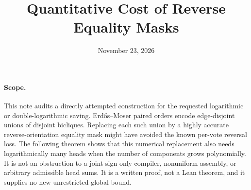 \documentclass[11pt]{article}
\title{Quantitative Cost of Reverse Equality Masks}
\author{}
\date{November 23, 2026}
\begin{document}
\maketitle

\paragraph{Scope.}
This note audits a directly attempted construction for the requested
logarithmic or double-logarithmic saving. Erd\H{o}s--Moser paired orders
encode edge-disjoint unions of disjoint bicliques. Replacing each such
union by a highly accurate reverse-orientation equality mask might
have avoided the known per-vote reversal loss. The following theorem
shows that this numerical replacement also needs logarithmically many
heads when the number of components grows polynomially.
It is not an obstruction to a joint sign-only compiler, nonuniform
assembly, or arbitrary admissible head sums. It is a written proof,
not a Lean theorem, and it supplies no new unrestricted global bound.
\end{document}
